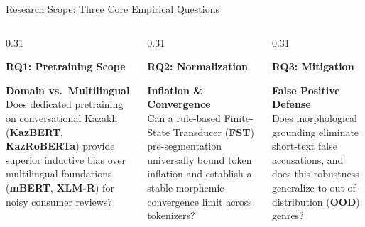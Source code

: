 \documentclass[aspectratio=169, 10pt]{beamer}
\newcommand{\subhead}[1]{{\normalsize\textbf{\color{DarkNavy}#1}\par\vspace{3pt}}}
\begin{document}
\begin{frame}{Research Scope: Three Core Empirical Questions}
    \begin{columns}[T]
        \begin{column}{0.31\textwidth}
            \subhead{RQ1: Pretraining Scope}
            \textbf{\color{DarkNavy}Domain vs.\ Multilingual}\\[4pt]
            {\small\color{SlateText}Does dedicated pretraining on conversational Kazakh (\textbf{KazBERT}, \textbf{KazRoBERTa}) provide superior inductive bias over multilingual foundations (\textbf{mBERT}, \textbf{XLM-R}) for noisy consumer reviews?}
        \end{column}
        \begin{column}{0.31\textwidth}
            \subhead{RQ2: Normalization}
            \textbf{\color{DarkNavy}Inflation \& Convergence}\\[4pt]
            {\small\color{SlateText}Can a rule-based Finite-State Transducer (\textbf{FST}) pre-segmentation universally bound token inflation and establish a stable morphemic convergence limit across tokenizers?}
        \end{column}
        \begin{column}{0.31\textwidth}
            \subhead{RQ3: Mitigation}
            \textbf{\color{DarkNavy}False Positive Defense}\\[4pt]
            {\small\color{SlateText}Does morphological grounding eliminate short-text false accusations, and does this robustness generalize to out-of-distribution (\textbf{OOD}) genres?}
        \end{column}
    \end{columns}
\end{frame}
\end{document}
